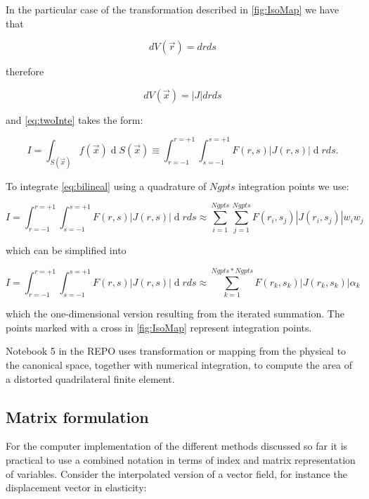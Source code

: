 In the particular case of the transformation described in \cref{fig:IsoMap} we have that


\[dV(\overrightarrow r)=drds\]

therefore

\[dV(\overrightarrow x)=\left|J\right|drds\]


and \cref{eq:twoInte} takes the form:


\begin{equation}
I=\int_{S(\overrightarrow x)}f(\overrightarrow x)\operatorname dS(\overrightarrow x)\equiv\int_{r=-1}^{r=+1}\int_{s=-1}^{s=+1}F(r,s)\left|J(r,s)\right|\operatorname drds.
\label{eq:bilineal}
\end{equation}

To integrate \ref{eq:bilineal} using a quadrature of $Ngpts$ integration points we use:

\begin{equation}
I=\int_{r=-1}^{r=+1}\int_{s=-1}^{s=+1}F(r,s)\left|J(r,s)\right|\operatorname drds\approx\sum_{i=1}^{Ngpts}\sum_{j=1}^{Ngpts}F(r_i,s_j)\left|J(r_i,s_j)\right|w_iw_j
\label{eq:Iquad}
\end{equation}

which can be simplified into

\begin{equation}
I=\int_{r=-1}^{r=+1}\int_{s=-1}^{s=+1}F(r,s)\left|J(r,s)\right|\operatorname drds\approx\sum_{k=1}^{Ngpts\ast Ngpts}F(r_k,s_k)\left|J(r_k,s_k)\right|\alpha_k
\label{eq:Iquad1}
\end{equation}

which the one-dimensional version resulting from the iterated summation. The points marked with a cross in \cref{fig:IsoMap} represent integration points.

\begin{tcolorbox}
Notebook 5 in the REPO uses transformation or mapping from the physical to the canonical space, together with numerical integration, to compute the area of a distorted quadrilateral finite element.
\end{tcolorbox}



\subsection{Matrix formulation}
For the computer implementation of the different methods discussed so far it is practical to use a combined notation in terms of index and matrix representation of variables. Consider the interpolated version of a vector field, for instance the displacement vector in elasticity:


